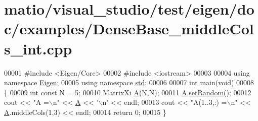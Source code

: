 \hypertarget{matio_2visual__studio_2test_2eigen_2doc_2examples_2_dense_base__middle_cols__int_8cpp_source}{}\section{matio/visual\+\_\+studio/test/eigen/doc/examples/\+Dense\+Base\+\_\+middle\+Cols\+\_\+int.cpp}
\label{matio_2visual__studio_2test_2eigen_2doc_2examples_2_dense_base__middle_cols__int_8cpp_source}

\begin{DoxyCode}
00001 \textcolor{preprocessor}{#include <Eigen/Core>}
00002 \textcolor{preprocessor}{#include <iostream>}
00003 
00004 \textcolor{keyword}{using namespace }\hyperlink{namespace_eigen}{Eigen};
00005 \textcolor{keyword}{using namespace }\hyperlink{namespacestd}{std};
00006 
00007 \textcolor{keywordtype}{int} main(\textcolor{keywordtype}{void})
00008 \{
00009     \textcolor{keywordtype}{int} \textcolor{keyword}{const} N = 5;
00010     MatrixXi \hyperlink{group___core___module_class_eigen_1_1_matrix}{A}(N,N);
00011     \hyperlink{group___core___module_class_eigen_1_1_matrix}{A}.\hyperlink{class_eigen_1_1_plain_object_base_af0e576a0e1aefc9ee346de44cc352ba3}{setRandom}();
00012     cout << \textcolor{stringliteral}{"A =\(\backslash\)n"} << \hyperlink{group___core___module_class_eigen_1_1_matrix}{A} << \textcolor{charliteral}{'\(\backslash\)n'} << endl;
00013     cout << \textcolor{stringliteral}{"A(1..3,:) =\(\backslash\)n"} << \hyperlink{group___core___module_class_eigen_1_1_matrix}{A}.middleCols(1,3) << endl;
00014     \textcolor{keywordflow}{return} 0;
00015 \}
\end{DoxyCode}
